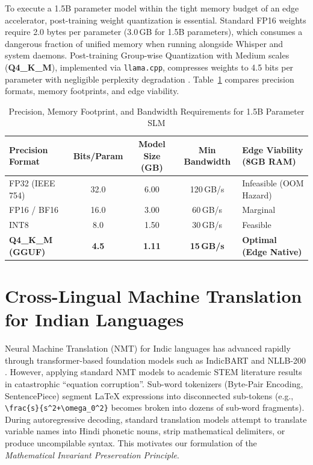 \documentclass[11pt,a4paper,oneside]{report}
\begin{document}
To execute a 1.5B parameter model within the tight memory budget of an edge accelerator, post-training weight quantization is essential. Standard FP16 weights require 2.0 bytes per parameter (3.0\,GB for 1.5B parameters), which consumes a dangerous fraction of unified memory when running alongside Whisper and system daemons. Post-training Group-wise Quantization with Medium scales (\textbf{Q4\_K\_M}), implemented via \texttt{llama.cpp}, compresses weights to 4.5 bits per parameter with negligible perplexity degradation \cite{dettmers2022llm}. Table~\ref{tab:quant_comparison} compares precision formats, memory footprints, and edge viability.

\begin{table}[htbp]
\centering
\small
\caption{Precision, Memory Footprint, and Bandwidth Requirements for 1.5B Parameter SLM}
\label{tab:quant_comparison}
\begin{tabularx}{\textwidth}{l c c c >{\raggedright\arraybackslash}X}
\toprule
\textbf{Precision Format} & \textbf{Bits/Param} & \textbf{Model Size (GB)} & \textbf{Min Bandwidth} & \textbf{Edge Viability (8GB RAM)} \\
\midrule
FP32 (IEEE 754)           & 32.0                & 6.00                     & 120\,GB/s              & Infeasible (OOM Hazard) \\
FP16 / BF16               & 16.0                & 3.00                     & 60\,GB/s               & Marginal \\
INT8                      & 8.0                 & 1.50                     & 30\,GB/s               & Feasible \\
\textbf{Q4\_K\_M (GGUF)}  & \textbf{4.5}        & \textbf{1.11}            & \textbf{15\,GB/s}      & \textbf{Optimal (Edge Native)} \\
\bottomrule
\end{tabularx}
\end{table}

\section{Cross-Lingual Machine Translation for Indian Languages}
Neural Machine Translation (NMT) for Indic languages has advanced rapidly through transformer-based foundation models such as IndicBART \cite{dabre2022indicbart} and NLLB-200 \cite{nllb2022}. However, applying standard NMT models to academic STEM literature results in catastrophic ``equation corruption''. Sub-word tokenizers (Byte-Pair Encoding, SentencePiece) segment LaTeX expressions into disconnected sub-tokens (e.g., \texttt{\textbackslash frac\{s\}\{s\textasciicircum 2+\textbackslash omega\_0\textasciicircum 2\}} becomes broken into dozens of sub-word fragments). During autoregressive decoding, standard translation models attempt to translate variable names into Hindi phonetic nouns, strip mathematical delimiters, or produce uncompilable syntax. This motivates our formulation of the \textit{Mathematical Invariant Preservation Principle}.
\end{document}
